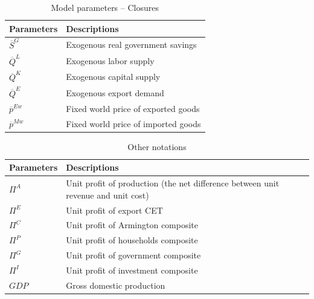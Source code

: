 \documentclass[12pt, a4paper]{article}
\numberwithin{equation}{section}
\numberwithin{figure}{section}
\numberwithin{table}{section}
\begin{document}
\begin{table}[htbp]
	\centering
	\caption{Model parameters -- Closures}
	\label{v2.0-model-parameters-closures}
	\small
	\begin{tabularx}{\linewidth}{@{} l X @{}}
		\toprule
		\textbf{Parameters} & \textbf{Descriptions} \\
		\midrule
		$\overline{S}^G$ 	& Exogenous real government savings \\
		$\overline{Q}^L$	& Exogenous labor supply \\
		$\overline{Q}^K$	& Exogenous capital supply \\
		$\overline{Q}^E$	& Exogenous export demand \\
		$\overline{p}^{Ew}$	& Fixed world price of exported goods \\
		$\overline{p}^{Mw}$	& Fixed world price of imported goods \\
		\bottomrule
	\end{tabularx}
\end{table}

\begin{table}[htbp]
	\centering
	\caption{Other notations}
	\label{v2.0-other-notations}
	\small
	\begin{tabularx}{\linewidth}{@{} l X @{}}
		\toprule
		\textbf{Parameters} & \textbf{Descriptions} \\
		\midrule
		$\Pi^A$	& Unit profit of production (the net difference between unit revenue and unit cost) \\
		$\Pi^E$	& Unit profit of export CET \\
		$\Pi^C$	& Unit profit of Armington composite \\
		$\Pi^P$	& Unit profit of households composite \\
		$\Pi^G$	& Unit profit of government composite \\
		$\Pi^I$	& Unit profit of investment composite \\
		$GDP$	& Gross domestic production \\
		\bottomrule
	\end{tabularx}
\end{table}

\end{document}
